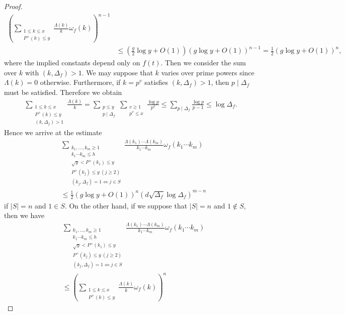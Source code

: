 \documentclass[a4paper,11pt]{amsart}
\theoremstyle{definition}
\numberwithin{equation}{section}
\begin{document}
\begin{proof}
\begin{align*}
\left(\sum_{\substack{1 \leq k \leq x \\ P^+(k) \leq y}} \frac{\Lambda(k)}{k} \omega_f(k)\right)^{n-1} \\
&\leq \left(\frac{g}{2} \log{y}+O(1)\right)
\left(g\log{y}+O(1)\right)^{n-1}
= \frac{1}{2} \left(g \log{y}+O(1)\right)^n, 
\end{align*}
where the implied constants depend only on $f(t)$. 
Then we consider the sum over $k$ with $(k,\Delta_f)>1$. 
We may suppose that $k$ varies over prime powers since $\Lambda(k)=0$ otherwise. 
Furthermore, if $k=p^v$ satisfies $(k,\Delta_f)>1$, then $p \mid \Delta_f$ must be satisfied. 
Therefore we obtain
\begin{align*}
\sum_{\substack{1 \leq k \leq x \\ P^+(k) \leq y \\ (k,\Delta_f)>1}} \frac{\Lambda(k)}{k}
= \sum_{\substack{p \leq y \\ p \mid \Delta_f}} \sum_{\substack{v \geq1 \\ p^v \leq x}} \frac{\log{p}}{p^v}
\leq \sum_{p \mid \Delta_f} \frac{\log{p}}{p-1}
\leq \log{\Delta_f}. 
\end{align*}
Hence we arrive at the estimate
\begin{align}\label{eq:09301335}
&\sum_{\substack{k_1,\ldots,k_m \geq 1 \\ k_1 \cdots k_m \leq h \\ \sqrt{y} < P^+(k_1) \leq y  \\ P^+(k_j) \leq y ~(j \geq 2) \\ (k_j,\Delta_f)=1 \Leftrightarrow j \in S}} 
\frac{\Lambda(k_1) \cdots \Lambda(k_m)}{k_1 \cdots k_m} \omega_f(k_1 \cdots k_m) \\
&\leq \frac{1}{2} \left(g \log{y}+O(1)\right)^n \left(d \sqrt{\Delta_f} \log{\Delta_f}\right)^{m-n} \nonumber
\end{align}
if $|S|=n$ and $1 \in S$. 
On the other hand, if we suppose that $|S|=n$ and $1 \notin S$, then we have
\begin{align}\label{eq:09301336}
&\sum_{\substack{k_1,\ldots,k_m \geq 1 \\ k_1 \cdots k_m \leq h \\ \sqrt{y} < P^+(k_1) \leq y  \\ P^+(k_j) \leq y ~(j \geq 2) \\ (k_j,\Delta_f)=1 \Leftrightarrow j \in S}} 
\frac{\Lambda(k_1) \cdots \Lambda(k_m)}{k_1 \cdots k_m} \omega_f(k_1 \cdots k_m) \\
&\leq \left(\sum_{\substack{1 \leq k \leq x \\ P^+(k) \leq y}} \frac{\Lambda(k)}{k} \omega_f(k)\right)^{n} 

\end{align}
\end{proof}
\end{document}
